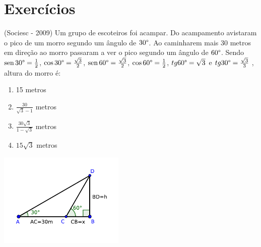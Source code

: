  \section{Exercícios}
 \begin{exer}
 (Sociesc - 2009) Um grupo de escoteiros foi acampar. Do acampamento avistaram o pico de um morro segundo um ângulo de $30 \degree$. Ao caminharem mais 30 metros em direção ao morro passaram a ver o pico segundo um ângulo de $60 \degree$. Sendo $\operatorname{sen} 30\degree = \frac{1}{2}$, $\cos 30\degree =\frac{\sqrt{3}}{2}$, $\operatorname{sen} 60\degree =\frac{\sqrt{3}}{2}$, $\cos 60\degree =\frac{1}{2}$, $tg 60\degree = \sqrt{3}$ e $tg 30\degree =\frac{\sqrt{3}}{3}$ , altura do morro é:
 \begin{multicols}{2}

 \begin{enumerate}
  \item 15 metros
  \item $\frac{30}{\sqrt{3}-1}$ metros
  \item $\frac{30\sqrt{3}}{1-\sqrt{3}}$ metros
  \item $15\sqrt{3}$ metros
 \end{enumerate}

 \includegraphics[width=6cm]{./cap_trigon/figs/tri_ret_exer.pdf}

 \end{multicols}
 \end{exer}
 
